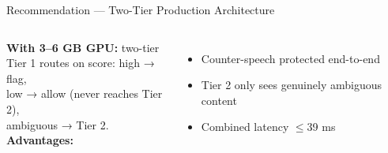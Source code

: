 \documentclass[aspectratio=169, 12pt]{beamer}
\begin{document}
\begin{frame}[shrink=25]{Recommendation — Two-Tier Production Architecture}
\begin{columns}[T]
      \textbf{With 3–6 GB GPU:} two-tier\\
      Tier 1 routes on score: high → flag,\\
      low → allow (never reaches Tier 2),\\
      ambiguous → Tier 2.\\[5pt]

      \textbf{Advantages:}
      \begin{itemize}
        \item Counter-speech protected end-to-end
        \item Tier 2 only sees genuinely ambiguous content
        \item Combined latency $\leq$39 ms
      \end{itemize}
  \end{columns}
\end{frame}
\end{document}
